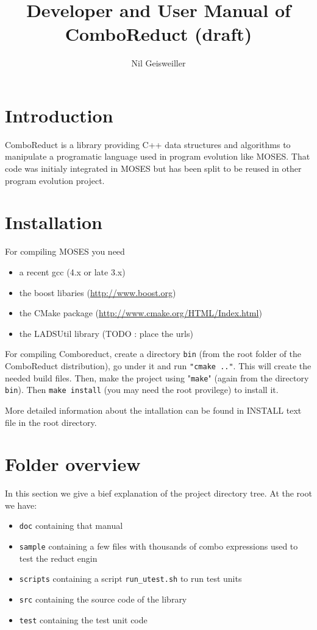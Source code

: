 \documentclass{article}
\title{Developer and User Manual of ComboReduct (draft)}
\author{Nil Geisweiller}
\begin{document}
  
  \maketitle
  
  \tableofcontents
  
  \newpage
  
  \section{Introduction}
  
  ComboReduct is a library providing C++ data structures and algorithms 
  to manipulate a programatic language used in program evolution 
  like MOSES. That code was initialy integrated in MOSES but has
  been split to be reused in other program evolution project.
  
  \section{Installation}
  
  For compiling MOSES you need
  \begin{itemize}
  \item a recent gcc (4.x or late 3.x)
  \item the boost libaries (\url{http://www.boost.org})
  \item the CMake package (\url{http://www.cmake.org/HTML/Index.html})
  \item the LADSUtil library (TODO : place the urls)
  \end{itemize}
  
  For compiling Comboreduct, create a directory \verb|bin|
  (from the root folder
  of the ComboReduct distribution), go under it
  and run \verb|"cmake .."|. This will create 
  the needed build files. Then, make the project using "\verb|make|" (again 
  from the directory \verb|bin|). Then \verb|make install| (you may need the
  root provilege) to install it.
  
  More detailed information about the intallation can be found in INSTALL text
  file in the root directory.

  \section{Folder overview}

  In this section we give a bief explanation of the project directory tree.
  At the root we have:
  \begin{itemize}
  \item \verb|doc| containing that manual
  \item \verb|sample| containing a few files with thousands of combo
    expressions used to test the reduct engin
  \item \verb|scripts| containing a script \verb|run_utest.sh| 
    to run test units
  \item \verb|src| containing the source code of the library
  \item \verb|test| containing the test unit code
  \end{itemize}
  
\end{document}
